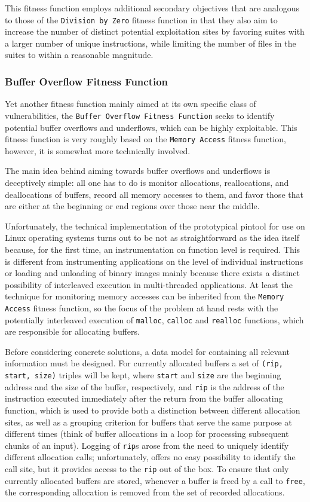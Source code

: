 This fitness function employs additional secondary objectives that are analogous to those of the
\texttt{Division by Zero} fitness function in that they also aim to increase the number of distinct
potential exploitation sites by favoring suites with a larger number of unique instructions, while limiting the
number of files in the suites to within a reasonable magnitude.

\subsubsection{Buffer Overflow Fitness Function}
Yet another fitness function mainly aimed at its own specific class of vulnerabilities, the \texttt{Buffer
Overflow Fitness Function} seeks to identify potential buffer overflows and underflows, which can be highly
exploitable. This fitness function is very roughly based on the \texttt{Memory Access} fitness function,
however, it is somewhat more technically involved. 

The main idea behind aiming towards buffer overflows and underflows is deceptively simple: all one has to do
is monitor allocations, reallocations, and deallocations of buffers, record all memory accesses to them, and
favor those that are either at the beginning or end regions over those near the middle.

Unfortunately, the technical implementation of the prototypical pintool for use on Linux operating systems
turns out to be not as straightforward as the idea itself because, for the first time, an instrumentation on
function level is required. This is different from instrumenting applications on the level of individual
instructions or loading and unloading of binary images mainly because there exists a distinct possibility of
interleaved execution in multi-threaded applications. At least the technique for monitoring memory accesses
can be inherited from the \texttt{Memory Access} fitness function, so the focus of the problem at hand rests
with the potentially interleaved execution of \texttt{malloc}, \texttt{calloc} and \texttt{realloc} functions,
which are responsible for allocating buffers. 

Before considering concrete solutions, a data model for containing all relevant information must be designed.
For currently allocated buffers a set of \texttt{(rip, start, size)} triples will be kept, where \texttt{start}
and \texttt{size} are the beginning address and the size of the buffer, respectively, and \texttt{rip} is the
address of the instruction executed immediately after the return from the buffer allocating function, which is
used to provide both a distinction between different allocation sites, as well as a grouping criterion for
buffers that serve the same purpose at different times (think of buffer allocations in a loop for processing
subsequent chunks of an input). Logging of \texttt{rip}s arose from the need to uniquely identify different
allocation calls; unfortunately, \pin offers no easy possibility to identify the call site, but it provides
access to the \texttt{rip} out of the box. To ensure that only currently allocated buffers are stored, whenever
a buffer is freed by a call to \texttt{free}, the corresponding allocation is removed from the set of
recorded allocations.

